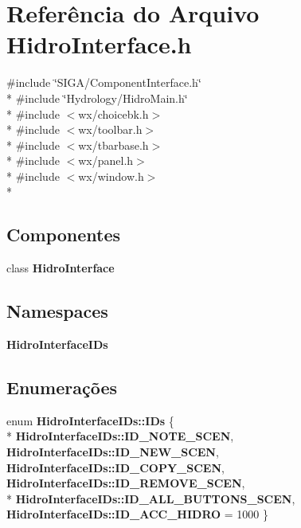 \section{Referência do Arquivo Hidro\+Interface.\+h}
\label{_hidro_interface_8h}
{\ttfamily \#include \char`\"{}S\+I\+G\+A/\+Component\+Interface.\+h\char`\"{}}\\*
{\ttfamily \#include \char`\"{}Hydrology/\+Hidro\+Main.\+h\char`\"{}}\\*
{\ttfamily \#include $<$wx/choicebk.\+h$>$}\\*
{\ttfamily \#include $<$wx/toolbar.\+h$>$}\\*
{\ttfamily \#include $<$wx/tbarbase.\+h$>$}\\*
{\ttfamily \#include $<$wx/panel.\+h$>$}\\*
{\ttfamily \#include $<$wx/window.\+h$>$}\\*
\subsection*{Componentes}
\begin{DoxyCompactItemize}
\item 
class {\bf Hidro\+Interface}
\end{DoxyCompactItemize}
\subsection*{Namespaces}
\begin{DoxyCompactItemize}
\item 
 {\bf Hidro\+Interface\+I\+Ds}
\end{DoxyCompactItemize}
\subsection*{Enumerações}
\begin{DoxyCompactItemize}
\item 
enum {\bf Hidro\+Interface\+I\+Ds\+::\+I\+Ds} \{ \\*
{\bf Hidro\+Interface\+I\+Ds\+::\+I\+D\+\_\+\+N\+O\+T\+E\+\_\+\+S\+C\+EN}, 
{\bf Hidro\+Interface\+I\+Ds\+::\+I\+D\+\_\+\+N\+E\+W\+\_\+\+S\+C\+EN}, 
{\bf Hidro\+Interface\+I\+Ds\+::\+I\+D\+\_\+\+C\+O\+P\+Y\+\_\+\+S\+C\+EN}, 
{\bf Hidro\+Interface\+I\+Ds\+::\+I\+D\+\_\+\+R\+E\+M\+O\+V\+E\+\_\+\+S\+C\+EN}, 
\\*
{\bf Hidro\+Interface\+I\+Ds\+::\+I\+D\+\_\+\+A\+L\+L\+\_\+\+B\+U\+T\+T\+O\+N\+S\+\_\+\+S\+C\+EN}, 
{\bf Hidro\+Interface\+I\+Ds\+::\+I\+D\+\_\+\+A\+C\+C\+\_\+\+H\+I\+D\+RO} = 1000
 \}
\end{DoxyCompactItemize}
